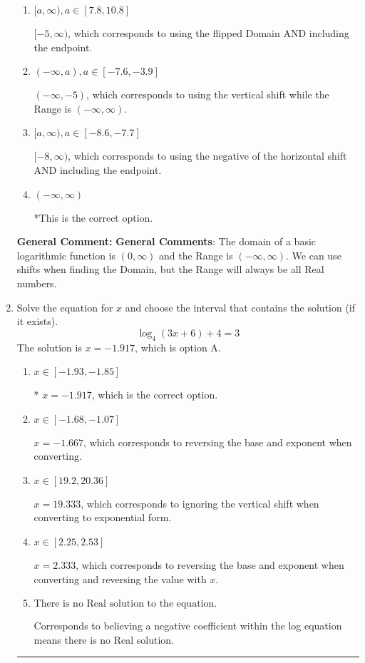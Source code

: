 \documentclass{extbook}[14pt]
\newcommand{\litem}[1]{\item #1

\rule{\textwidth}{0.4pt}}
\begin{document}
\begin{enumerate}
{\begin{enumerate}[label=\Alph*.]
$(-\infty, 5)$, which corresponds to using the using the negative of vertical shift on $(0, \infty)$.
\item \( [a, \infty), a \in [7.8, 10.8] \)

$[-5, \infty)$, which corresponds to using the flipped Domain AND including the endpoint.
\item \( (-\infty, a), a \in [-7.6, -3.9] \)

$(-\infty, -5)$, which corresponds to using the vertical shift while the Range is $(-\infty, \infty)$.
\item \( [a, \infty), a \in [-8.6, -7.7] \)

$[-8, \infty)$, which corresponds to using the negative of the horizontal shift AND including the endpoint.
\item \( (-\infty, \infty) \)

*This is the correct option.
\end{enumerate}

\textbf{General Comment:} \textbf{General Comments}: The domain of a basic logarithmic function is $(0, \infty)$ and the Range is $(-\infty, \infty)$. We can use shifts when finding the Domain, but the Range will always be all Real numbers.
}
\litem{
Solve the equation for $x$ and choose the interval that contains the solution (if it exists).
\[ \log_{4}{(3x+6)}+4 = 3 \]The solution is \( x = -1.917 \), which is option A.\begin{enumerate}[label=\Alph*.]
\item \( x \in [-1.93, -1.85] \)

* $x = -1.917$, which is the correct option.
\item \( x \in [-1.68, -1.07] \)

$x = -1.667$, which corresponds to reversing the base and exponent when converting.
\item \( x \in [19.2, 20.36] \)

$x = 19.333$, which corresponds to ignoring the vertical shift when converting to exponential form.
\item \( x \in [2.25, 2.53] \)

$x = 2.333$, which corresponds to reversing the base and exponent when converting and reversing the value with $x$.
\item \( \text{There is no Real solution to the equation.} \)

Corresponds to believing a negative coefficient within the log equation means there is no Real solution.
\end{enumerate}

}
\end{enumerate}
\end{document}
